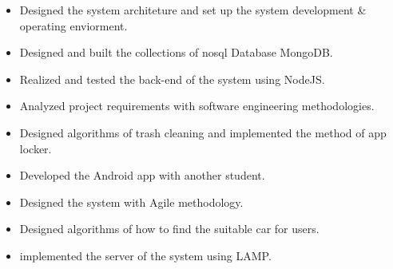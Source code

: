 \documentclass{resume}
\begin{document}
\begin{itemize}
\item Designed the system architeture and set up the system development \& operating enviorment.
\item Designed and built the collections of nosql Database MongoDB.
\item Realized and tested the back-end of the system using NodeJS.
\end{itemize}


\begin{itemize}
\item Analyzed project requirements with software engineering methodologies.
\item Designed algorithms of trash cleaning and implemented the method of app locker.
\item Developed the Android app with another student.
\end{itemize}


\begin{itemize}
\item Designed the system with Agile methodology.
\item Designed algorithms of how to find the suitable car for users.
\item implemented the server of the system using LAMP.
\end{itemize}




\end{document}
